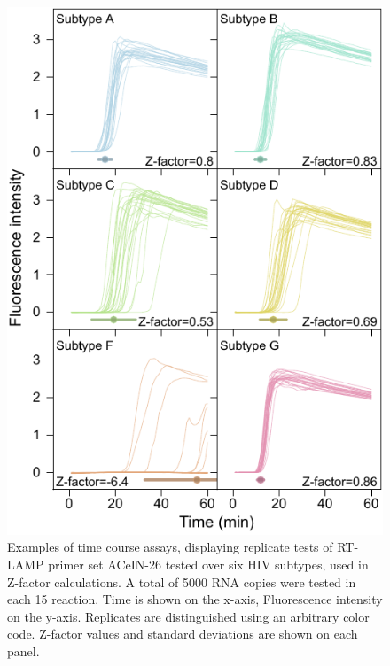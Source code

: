 \documentclass[../sherrill-Mix_thesis.tex]{subfiles}
\begin{document}
			\begin{figure}
			\centering
				\includegraphics[width=\textwidth]{4.pdf} %
			\caption[Examples of time course assays, displaying replicate tests of RT-LAMP primer set ACeIN-26 tested over six HIV subtypes, used in Z-factor calculations]{Examples of time course assays, displaying replicate tests of RT-LAMP primer set ACeIN-26 tested over six HIV subtypes, used in Z-factor calculations. A total of 5000 RNA copies were tested in each 15 \uL{} reaction. Time is shown on the x-axis, Fluorescence intensity on the y-axis. Replicates are distinguished using an arbitrary color code. Z-factor values and standard deviations are shown on each panel.}
			\label{figZFactor}
			\end{figure}
\end{document}
